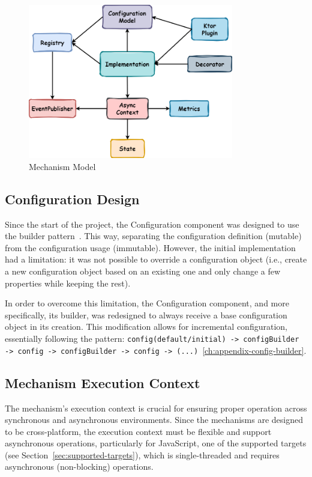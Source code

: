 \begin{figure}
    \centering
    \includegraphics[width=0.8\textwidth]{../figures/03_mechanism-model}
    \caption{Mechanism Model}
    \label{fig:mechanism-model}
\end{figure}

\subsection{Configuration Design}\label{subsec:configuration-design}

Since the start of the project, the Configuration component was designed to use the builder pattern~\cite{wiki:builder-pattern}.
This way, separating the configuration definition (mutable) from the configuration usage (immutable).
However, the initial implementation had a limitation: it was not possible to override a configuration object (i.e., create a new configuration object based on an existing one and only change a few properties while keeping the rest).

In order to overcome this limitation, the Configuration component, and more specifically, its builder, was redesigned
to always receive a base configuration object in its creation.
This modification allows for incremental configuration, essentially following the pattern: \texttt{config(default/initial) -> configBuilder -> config -> configBuilder -> config -> (...)}~\ref{ch:appendix-config-builder}.

\subsection{Mechanism Execution Context}\label{subsec:mechanism-execution-context}

The mechanism's execution context is crucial for ensuring proper operation across synchronous and asynchronous environments.
Since the mechanisms are designed to be cross-platform, the execution context must be flexible and support asynchronous operations, particularly for JavaScript, one of the supported targets (see Section~\ref{sec:supported-targets}), which is single-threaded and requires asynchronous (non-blocking) operations.

